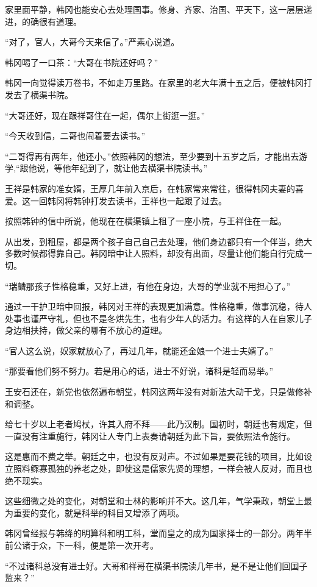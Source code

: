 家里面平静，韩冈也能安心去处理国事。修身、齐家、治国、平天下，这一层层递进，的确很有道理。

“对了，官人，大哥今天来信了。”严素心说道。

韩冈喝了一口茶：“大哥在书院还好吗？”

韩冈一向觉得读万卷书，不如走万里路。在家里的老大年满十五之后，便被韩冈打发去了横渠书院。

“大哥还好，现在跟祥哥住在一起，偶尔上街逛一逛。”

“今天收到信，二哥也闹着要去读书。”

“二哥得再有两年，他还小。”依照韩冈的想法，至少要到十五岁之后，才能出去游学,“跟他说，等他年纪到了，就让他去横渠书院读书。”

王祥是韩家的准女婿，王厚几年前入京后，在韩家常来常往，很得韩冈夫妻的喜爱。这一回韩冈将韩钟打发去读书，王祥也一起跟了过去。

按照韩钟的信中所说，他现在在横渠镇上租了一座小院，与王祥住在一起。

从出发，到租屋，都是两个孩子自己自己去处理，他们身边都只有一个伴当，绝大多数时候都得靠自己。韩冈暗中让人照料，却没有出面，尽量让他们能自行完成一切。

“瑞麟那孩子性格稳重，又好上进，有他在身边，大哥的学业就不用担心了。”

通过一干护卫暗中回报，韩冈对王祥的表现更加满意。性格稳重，做事沉稳，待人处事也谨严守礼，但也不是冬烘先生，也有少年人的活力。有这样的人在自家儿子身边相扶持，做父亲的哪有不放心的道理。

“官人这么说，奴家就放心了，再过几年，就能还金娘一个进士夫婿了。”

“那要看他们努不努力。若是用心的话，进士不好说，诸科是轻而易举。”

王安石还在，新党也依然遍布朝堂，韩冈这两年没有对新法大动干戈，只是做修补和调整。

给七十岁以上老者鸠杖，许其入府不拜——此乃汉制。国初时，朝廷也有规定，但一直没有注重施行，韩冈让人专门上表奏请朝廷为此下旨，要依照法令施行。

这是惠而不费之举。朝廷之中，也没有反对声。不过如果是要花钱的项目，比如设立照料鳏寡孤独的养老之处，即使这是儒家先贤的理想，一样会被人反对，而且也绝不现实。

这些细微之处的变化，对朝堂和士林的影响并不大。这几年，气学秉政，朝堂上最为重要的变化，就是科举的科目又增添了两项。

韩冈曾经报与韩绛的明算科和明工科，堂而皇之的成为国家择士的一部分。两年半前公诸于众，下一科，便是第一次开考。

“不过诸科总没有进士好。大哥和祥哥在横渠书院读几年书，是不是让他们回国子监来？”


